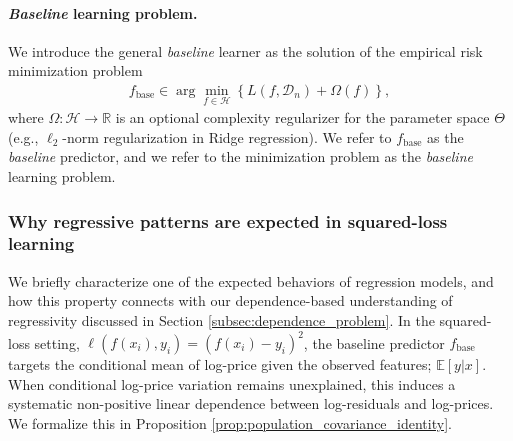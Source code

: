 \documentclass[12pt, draft]{article}
\theoremstyle{plain}
\theoremstyle{definition}
\newcommand{\1}{\mathbf{1}}
\newcommand{\D}{\mathcal{D}}
\renewcommand{\H}{\mathcal{H}}
\newcommand{\Expected}[1]{\mathbb{E}[#1]}
\begin{document}
\paragraph{\textit{Baseline} learning problem.} We introduce the general \textit{baseline} learner as the solution of the empirical risk minimization problem
\begin{align}
\label{opt:base_model}
f_{\mathrm{base}}
\in
\arg\min_{f \in \H}
\left\{
L(f, \D_n)+\Omega(f)
\right\},
\end{align}
where $\Omega:\H\to\mathbb R$ is an optional complexity regularizer for the parameter space $\Theta$ (e.g., $\ell_2$-norm regularization in Ridge regression). We refer to $f_{{\mathrm{base}}}$ as the \textit{baseline} predictor, and we refer to the minimization problem as the \textit{baseline} learning problem. 



\subsubsection{Why regressive patterns are expected in squared-loss learning}
\label{subsec:squared_loss_regressivity}

We briefly characterize one of the expected behaviors of regression models, and how this property connects with our dependence-based understanding of regressivity discussed in Section \ref{subsec:dependence_problem}. In the squared-loss setting, $\ell(f(x_i), y_i)=(f(x_i)- y_i)^2$, the baseline predictor $f_{\mathrm{base}}$ targets the conditional mean of log-price given the observed features; $\Expected{y|x}$. When conditional log-price variation remains unexplained, this induces a systematic non-positive linear dependence between log-residuals and log-prices. We formalize this in Proposition \ref{prop:population_covariance_identity}.


\end{document}
